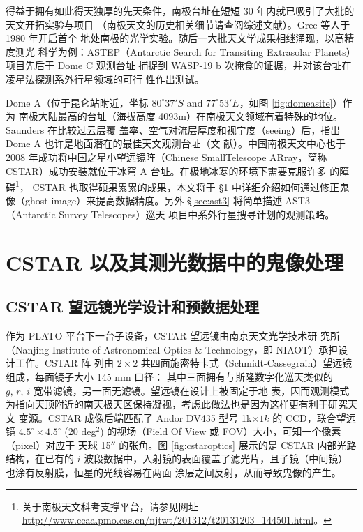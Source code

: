 得益于拥有如此得天独厚的先天条件，南极台址在短短 30 年内就已吸引了大批的天文开拓实验与项目
（南极天文的历史相关细节请查阅综述文献）。Grec 等人于 1980 年开启首个
地处南极的光学实验\cite{Grec1980}。随后一大批天文学成果相继涌现\cite{Burton2010}，以高精度测光
科学为例：ASTEP（Antarctic Search for Transiting Extrasolar Planets）项目先后于 Dome C 观测台址
捕捉到 WASP-19 b 次掩食的证据\cite{Abe2013STEP}，并对该台址在凌星法探测系外行星领域的可行
性作出测试\cite{Crouzet2010}。

Dome A（位于昆仑站附近，坐标 $80^{\circ}37'S$ and $77^{\circ}53'E$，如图 \ref{fig:domeasite}）作为
南极大陆最高的台址（海拔高度 4093m）在南极天文领域有着特殊的地位。Saunders 在比较过云层覆
盖率、空气对流层厚度和视宁度（seeing）后，指出 Dome A 也许是地面潜在的最佳天文观测台址（文
献）。中国南极天文中心也于 2008 年成功将中国之星小望远镜阵（Chinese 
SmallTelescope ARray，简称 CSTAR）成功安装就位于冰穹 A 台址。在极地冰寒的环境下需要克服许多
的障碍\footnote{关于南极天文科考支撑平台，请参见网址 \url{http://www.ccaa.pmo.cas.cn/njtwt/201312/t20131203_144501.html}。}，
CSTAR 也取得硕果累累的成果，本文将于 \S \ref{sec:cstar} 中详细介绍如何通过修正鬼像（ghost 
image）来提高数据精度。另外 \S \ref{sec:ast3} 将简单描述 AST3（Antarctic Survey Telescopes）巡天
项目中系外行星搜寻计划的观测策略。


\section{CSTAR 以及其测光数据中的鬼像处理}  \label{sec:cstar}
\subsection{CSTAR 望远镜光学设计和预数据处理}  \label{sec:cstardesign}
作为 PLATO 平台\cite{Lawrence2009,Yang2009}下一台子设备，CSTAR 望远镜由南京天文光学技术研
究所（Nanjing Institute of Astronomical Optics \& Technology，即 NIAOT）承担设计工作。CSTAR 阵
列由 $2\times2$ 共四面施密特卡式（Schmidt-Cassegrain）望远镜组成，每面镜子大小 145 mm 口径：
其中三面拥有与斯隆数字化巡天类似的 $g,\,r,\,i$  宽带滤镜，另一面无滤镜。望远镜在设计上被固定于地
表，因而观测模式为指向天顶附近的南天极天区保持凝视，考虑此做法也是因为这样更有利于研究天文
变源。CSTAR 成像后端匹配了 Andor DV435 型号 1k$\times1k$ 的 CCD，联合望远镜 $4.5^\circ{} 
\times 4.5^\circ{}$ (20 deg$^2$) 的视场（Field Of View 或 FOV）大小，可知一个像素（pixel）对应于
天球 15$''$ 的张角\cite{Yuan2008}。图 \ref{fig:cstaroptics} 展示的是 CSTAR 内部光路结构，在已有的 
$i$ 波段数据中，入射镜的表面覆盖了滤光片，且子镜（中间镜）也涂有反射膜，恒星的光线容易在两面
涂层之间反射，从而导致鬼像的产生。


